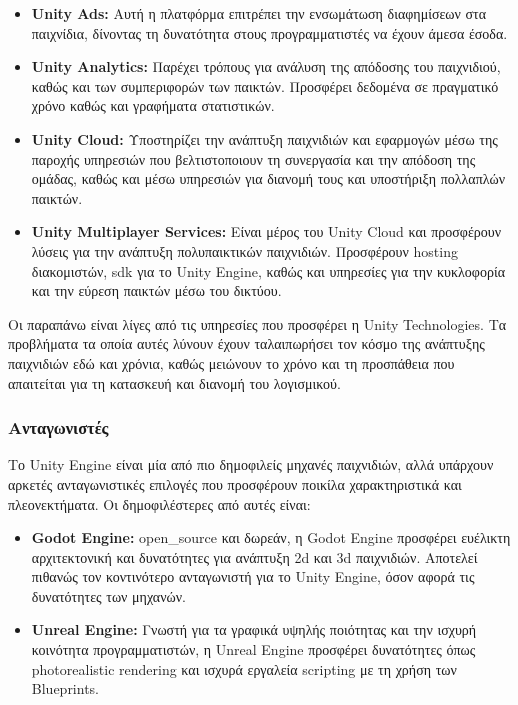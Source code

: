 \begin{itemize}
    \item \textbf{Unity Ads:} Αυτή η πλατφόρμα επιτρέπει την ενσωμάτωση διαφημίσεων στα παιχνίδια, δίνοντας τη δυνατότητα στους προγραμματιστές να έχουν άμεσα έσοδα\cite{noauthor_unity_nodate-1}.
    \item \textbf{Unity Analytics:} Παρέχει τρόπους για ανάλυση της απόδοσης του παιχνιδιού, καθώς και των συμπεριφορών των παικτών. Προσφέρει δεδομένα σε πραγματικό χρόνο καθώς και γραφήματα στατιστικών\cite{noauthor_game_nodate}.
    \item \textbf{Unity Cloud:} Υποστηρίζει την ανάπτυξη παιχνιδιών και εφαρμογών μέσω της παροχής υπηρεσιών που βελτιστοποιουν τη συνεργασία και την απόδοση της ομάδας, καθώς και μέσω υπηρεσιών για διανομή τους και υποστήριξη πολλαπλών παικτών\cite{noauthor_unity_nodate-3}.
    \item \textbf{Unity Multiplayer Services:} Είναι μέρος του Unity Cloud και προσφέρουν λύσεις για την ανάπτυξη πολυπαικτικών παιχνιδιών. Προσφέρουν hosting διακομιστών, \acrfull{sdk} για το Unity Engine, καθώς και υπηρεσίες για την κυκλοφορία και την εύρεση παικτών μέσω του δικτύου\cite{noauthor_multiplayer_nodate}.
\end{itemize}

Οι παραπάνω είναι λίγες από τις υπηρεσίες που προσφέρει η Unity Technologies. Τα προβλήματα τα οποία αυτές λύνουν έχουν ταλαιπωρήσει τον κόσμο της ανάπτυξης παιχνιδιών εδώ και χρόνια, καθώς μειώνουν το χρόνο και τη προσπάθεια που απαιτείται για τη κατασκευή και διανομή του λογισμικού\cite{al-said_ahmad_scalability_2019}.

\subsubsection{Ανταγωνιστές}

Το Unity Engine είναι μία από πιο δημοφιλείς μηχανές παιχνιδιών, αλλά υπάρχουν αρκετές ανταγωνιστικές επιλογές που προσφέρουν ποικίλα χαρακτηριστικά και πλεονεκτήματα\cite{leroux_best_2023}. Οι δημοφιλέστερες από αυτές είναι:

\begin{itemize}
    \item \textbf{Godot Engine\cite{engine_godot_nodate}:} \Gls{open_source} και δωρεάν, η Godot Engine προσφέρει ευέλικτη αρχιτεκτονική και δυνατότητες για ανάπτυξη \acrshort{2d} και \acrshort{3d} παιχνιδιών. Αποτελεί πιθανώς τον κοντινότερο ανταγωνιστή για το Unity Engine, όσον αφορά τις δυνατότητες των μηχανών.
    \item \textbf{Unreal Engine\cite{noauthor_most_nodate}:} Γνωστή για τα γραφικά υψηλής ποιότητας και την ισχυρή κοινότητα προγραμματιστών, η Unreal Engine προσφέρει δυνατότητες όπως \gls{photorealistic} \gls{rendering} και ισχυρά εργαλεία scripting με τη χρήση των Blueprints.
\end{itemize}
